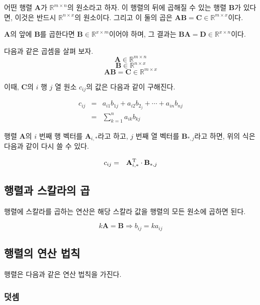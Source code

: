 어떤 행렬 $\mathbf A$가 $\mathbb R^{m \times n}$의 원소라고 하자. 이 행렬의 뒤에 곱해질 수 있는 행렬 $\mathbf B$가 있다면,
이것은 반드시 $\mathbb R^{n \times x}$의 원소이다. 그리고 이 둘의 곱은  $\mathbf {AB} = \mathbf C \in \mathbb R^{m \times x}$이다.

$\mathbf A$의 앞에 $\mathbf B$를 곱한다면 $\mathbf B \in \mathbb R^{x \times m}$이어야 하며, 
그 결과는 $\mathbf {BA} = \mathbf D \in \mathbb R^{x \times n}$이다.

다음과 같은 곱셈을 살펴 보자.
$$\mathbf A \in \mathbb R^{m \times n}$$
$$\mathbf B \in \mathbb R^{n \times x}$$
$$\mathbf {AB} = \mathbf C \in \mathbb R^{m \times x}$$


이때, $\mathbf C$의 $i$ 행 $j$ 열 원소 $c_{ij}$의 값은 다음과 같이 구해진다.

\begin{eqnarray}
c_{ij} & =  &a_{i1}b_{1j} + a_{i2}b_{2_j} + \cdots + a_{in}b_{nj} \\ \nonumber
    & = & \sum_{k=1}^n a_{ik} b_{kj}
\end{eqnarray}

행렬 $\mathbf A$의 $i$ 번째 행 벡터를 $\mathbf A_{i,*}$라고 하고, $j$ 번째 열 벡터를 $\mathbf B_{*,j}$라고 하면,
위의 식은 다음과 같이 다시 쓸 수 있다.

\begin{eqnarray}
c_{ij} & =  & \mathbf A_{i,*}^{\rm T} \cdot \mathbf B_{*,j}
\end{eqnarray}

\subsection{행렬과 스칼라의 곱}

행렬에 스칼라를 곱하는 연산은 해당 스칼라 값을 행렬의 모든 원소에 곱하면 된다.

$$k \mathbf A  = \mathbf B \Rightarrow b_{ij} = k a_{ij}$$

\subsection{행렬의 연산 법칙}

행렬은 다음과 같은 연산 법칙을 가진다.

\subsubsection{덧셈}

